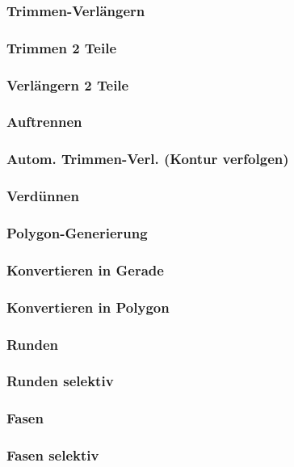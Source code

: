 \documentclass[14pt,a4paper]{book}
\begin{document}
			\subsubsection{Trimmen-Verlängern} 
			\subsubsection{Trimmen 2 Teile} 
			\subsubsection{Verlängern 2 Teile} 
			\subsubsection{Auftrennen} 
			\subsubsection{Autom. Trimmen-Verl. (Kontur verfolgen)} 
			\subsubsection{Verdünnen} 
			\subsubsection{Polygon-Generierung} 
			\subsubsection{Konvertieren in Gerade} 
			\subsubsection{Konvertieren in Polygon}
			\subsubsection{Runden} 
			\subsubsection{Runden selektiv} 
			\subsubsection{Fasen} 
			\subsubsection{Fasen selektiv} 
						
\end{document}
